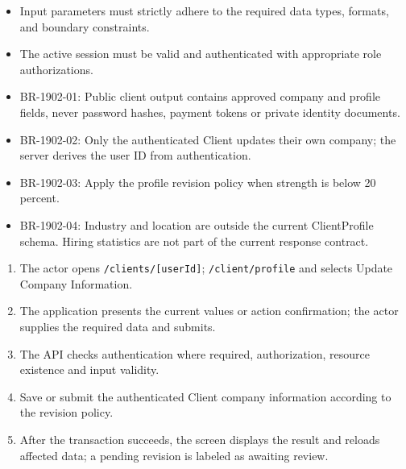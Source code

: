 \begin{itemize}[leftmargin=1.6em,topsep=3pt,itemsep=2pt,parsep=0pt,label=$\bullet$]
    \item Input parameters must strictly adhere to the required data types, formats, and boundary constraints.
    \item The active session must be valid and authenticated with appropriate role authorizations.
\end{itemize}

\begin{itemize}[leftmargin=1.6em,topsep=3pt,itemsep=2pt,parsep=0pt,label=$\bullet$]\brrulelist
    \item BR-1902-01: Public client output contains approved company and profile fields, never password hashes, payment tokens or private identity documents.
    \item BR-1902-02: Only the authenticated Client updates their own company; the server derives the user ID from authentication.
    \item BR-1902-03: Apply the profile revision policy when strength is below 20 percent.
    \item BR-1902-04: Industry and location are outside the current ClientProfile schema. Hiring statistics are not part of the current response contract.
\end{itemize}

\begin{enumerate}[leftmargin=1.8em,topsep=3pt,itemsep=2pt,parsep=0pt]
    \item The actor opens \texttt{/\allowbreak{}clients/\allowbreak{}[userId]}; \texttt{/\allowbreak{}client/\allowbreak{}profile} and selects Update Company Information.
    \item The application presents the current values or action confirmation; the actor supplies the required data and submits.
    \item The API checks authentication where required, authorization, resource existence and input validity.
    \item Save or submit the authenticated Client company information according to the revision policy.
    \item After the transaction succeeds, the screen displays the result and reloads affected data; a pending revision is labeled as awaiting review.
\end{enumerate}


